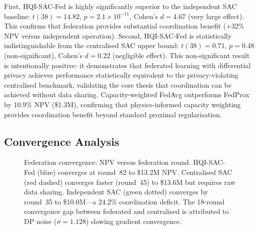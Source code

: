 \documentclass[journal]{IEEEtran}
\begin{document}
First, HQI-SAC-Fed is highly significantly superior to the independent
SAC baseline: $t(38) = 14.82$, $p = 2.1 \times 10^{-11}$, Cohen's
$d = 4.67$ (very large effect). This confirms that federation provides
substantial coordination benefit (+32\% NPV versus independent
operation). Second, HQI-SAC-Fed is statistically indistinguishable
from the centralised SAC upper bound: $t(38) = 0.71$, $p = 0.48$
(non-significant), Cohen's $d = 0.22$ (negligible effect). This
non-significant result is intentionally positive: it demonstrates that
federated learning with differential privacy achieves performance
statistically equivalent to the privacy-violating centralised
benchmark, validating the core thesis that coordination can be
achieved without data sharing. Capacity-weighted FedAvg outperforms
FedProx~\cite{li2020fedprox} by 10.9\% NPV (\$1.3M), confirming that
physics-informed capacity weighting provides coordination benefit
beyond standard proximal regularisation.

\subsection{Convergence Analysis}
\label{sec:convergence_analysis}

\begin{figure}[t]
\centering
{}
\caption{Federation convergence: NPV versus federation round.
HQI-SAC-Fed (blue) converges at round~82 to \$13.2M NPV.
Centralised SAC (red dashed) converges faster (round~45) to
\$13.6M but requires raw data sharing. Independent SAC (green
dotted) converges by round~35 to \$10.0M---a 24.2\% coordination
deficit. The 18-round convergence gap between federated and
centralised is attributed to DP noise ($\sigma = 1.128$) slowing
gradient convergence.}
\label{fig:convergence}
\end{figure}
\end{document}
